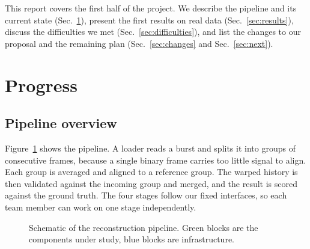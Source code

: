 \documentclass[10pt,twocolumn]{article}
\newcommand{\sref}[1]{Sec.~\ref{#1}}
\begin{document}
This report covers the first half of the project. We describe the pipeline and its current state (\sref{sec:progress}), present the first results on real data (\sref{sec:results}), discuss the difficulties we met (\sref{sec:difficulties}), and list the changes to our proposal and the remaining plan (\sref{sec:changes} and \sref{sec:next}).

\section{Progress}
\label{sec:progress}

\subsection{Pipeline overview}

Figure~\ref{fig:pipeline} shows the pipeline. A loader reads a burst and splits it into groups of consecutive frames, because a single binary frame carries too little signal to align. Each group is averaged and aligned to a reference group. The warped history is then validated against the incoming group and merged, and the result is scored against the ground truth. The four stages follow our fixed interfaces, so each team member can work on one stage independently.

\begin{figure}[t]
\centering
{}
\caption{Schematic of the reconstruction pipeline. Green blocks are the components under study, blue blocks are infrastructure.}
\label{fig:pipeline}
\end{figure}
\end{document}
